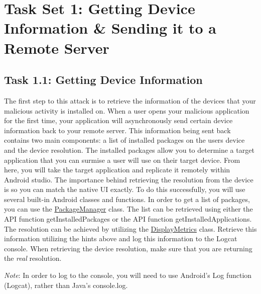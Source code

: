 \documentclass[letterpaper,12pt]{report}
\begin{document}

\section*{Task Set 1: Getting Device Information \& Sending it to a Remote Server}\label{sec:Task Set 1: Getting Device Information & Sending It To Remote Server}

\subsection*{Task 1.1: Getting Device Information}\label{sec:Task-1.1-Getting-Device-Information}

The first step to this attack is to retrieve the information of the devices that your malicious activity is installed on. When a user opens your malicious application for the first time, your application will asynchronously send certain device information back to your remote server. This information being sent back contains two main components: a list of installed packages on the users device and the device resolution. The installed packages allow you to determine a target application that you can surmise a user will use on their target device. From here, you will take the target application and replicate it remotely within Android studio. The importance behind retrieving the resolution from the device is so you can match the native UI exactly. To do this successfully, you will use several built-in Android classes and functions. In order to get a list of packages, you can use the \href{https://developer.android.com/reference/android/content/pm/PackageManager}{PackageManager} class. The list can be retrieved using either the API function getInstalledPackages or the API function getInstalledApplications. The resolution can be achieved by utilizing the \href{https://developer.android.com/reference/android/util/DisplayMetrics}{DisplayMetrics} class. Retrieve this information utilizing the hints above and log this information to the Logcat console. When retrieving the device resolution, make sure that you are returning the \emph{real} resolution.

\emph{Note}: In order to log to the console, you will need to use Android’s Log function (Logcat), rather than Java’s console.log. 
\end{document}
